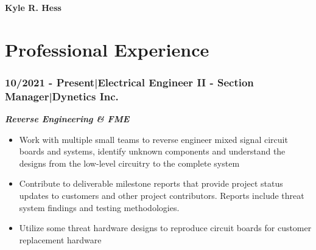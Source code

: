 \documentclass[]{article}
\begin{document}
\begin{singlespace}
\noindent\textbf{\huge{Kyle R. Hess}}
\hfill \break
\noindent\makebox[\linewidth]{\rule{\textwidth}{1pt}}
    \vspace{-8mm}

\section*{Professional Experience}

\subsubsection*{10/2021 - Present\hspace{3 mm}|\hspace{3 mm}Electrical Engineer II - Section Manager\hspace{3 mm}|\hspace{3 mm}Dynetics Inc.}

\noindent\textbf{\emph{Reverse Engineering \& FME}}    
\begin{itemize}
    \setlength\itemsep{0em}
    \item Work with multiple small teams to reverse engineer mixed signal circuit boards and systems, 
    identify unknown components and understand the designs from the low-level circuitry to the complete system
    \item Contribute to deliverable milestone reports that provide project status updates to customers 
    and other project contributors. Reports include threat system findings and testing methodologies.
    \item Utilize some threat hardware designs to reproduce circuit boards for customer replacement hardware 
\end{itemize}


\end{singlespace}
\end{document}
